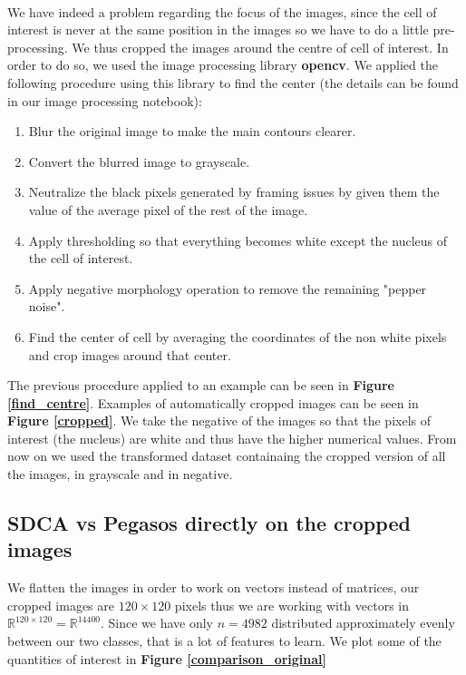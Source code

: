 \documentclass[10pt,a4paper]{article}
\begin{document}
\paragraph{}
We have indeed a problem regarding the focus of the images, since the cell of interest is never at the same position in the images so we have to do a little pre-processing. We thus cropped the images around the centre of cell of interest. In order to do so, we used the image processing library \textbf{opencv}. We applied the following procedure using this library to find the center (the details can be found in our image processing notebook): 
\begin{enumerate}
	\item Blur the original image to make the main contours clearer.
	\item Convert the blurred image to grayscale.
	\item Neutralize the black pixels generated by framing issues by given them the value of the average pixel of the rest of the image.
	\item Apply thresholding so that everything becomes white except the nucleus of the cell of interest.
	\item Apply negative morphology operation to remove the remaining "pepper noise".
	\item Find the center of cell by averaging the coordinates of the non white pixels and crop images around that center.
\end{enumerate}

The previous procedure applied to an example can be seen in \textbf{Figure  \ref{find_centre}}. Examples of automatically cropped images can be seen in \textbf{Figure \ref{cropped}}. We take the negative of the images so that the pixels of interest (the nucleus) are white and thus have the higher numerical values. From now on we used the transformed dataset containaing the cropped version of all the images, in grayscale and in negative.



\subsection {SDCA vs Pegasos directly on the cropped images}

We flatten the images in order to work on vectors instead of matrices, our cropped images are $120 \times 120$ pixels thus we are working with vectors in $\mathbb{R}^{120\times120} = \mathbb{R}^{14400}$. Since we have only $n=4982$ distributed approximately evenly between our two classes, that is a lot of features to learn. We plot some of the quantities of interest in \textbf{Figure \ref{comparison_original}}
\end{document}
